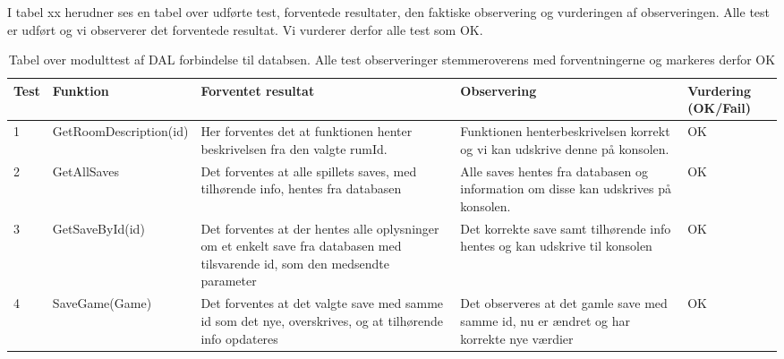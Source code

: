I tabel xx herudner ses en tabel over udførte test, forventede resultater, den faktiske observering og vurderingen af observeringen.
Alle test er udført og vi observerer det forventede resultat. Vi vurderer derfor alle test som OK.

\begin{table}[H]
\caption{Tabel over modulttest af DAL forbindelse til databsen. Alle test observeringer stemmeroverens med forventningerne og markeres derfor OK }
\begin{tabular}{|p{0.75cm}|p{3.6cm}|p{3.5cm}|p{3.5cm}|p{1.9cm}|} \hline
 \textbf{Test} & \textbf{Funktion} & \textbf{Forventet resultat} & \textbf{Observering} & \textbf{Vurdering} \textbf{(OK/Fail)}\\\hline
 1 & GetRoomDescription(id) & Her forventes det at funktionen henter beskrivelsen fra den valgte rumId. & Funktionen henterbeskrivelsen korrekt og vi kan udskrive denne på konsolen. & OK \\ \hline
 2 & GetAllSaves & Det forventes at alle spillets saves, med tilhørende info, hentes fra databasen & Alle saves hentes fra databasen og information om disse kan udskrives på konsolen. & OK \\ \hline
 3 & GetSaveById(id) & Det forventes at der hentes alle oplysninger om et enkelt save fra databasen med tilsvarende id, som den medsendte parameter & Det korrekte save samt tilhørende info hentes og kan udskrive til konsolen & OK \\ \hline
 4 & SaveGame(Game) & Det forventes at det valgte save med samme id som det nye, overskrives, og at tilhørende info opdateres & Det observeres at det gamle save med samme id, nu er ændret og har korrekte nye værdier & OK \\ \hline
\end{tabular}
\end{table}

